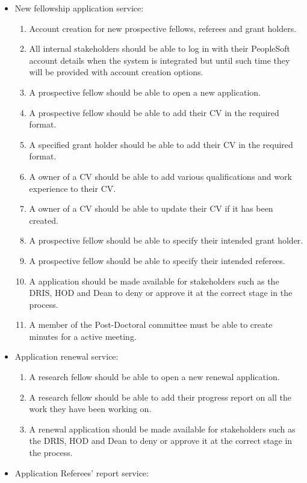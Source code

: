 \documentclass[12pt]{article}
\begin{document}
		\begin{itemize}
			\item New fellowship application service:		
			\begin{enumerate}
				\item Account creation for new prospective fellows, referees and grant holders.
				\item All internal stakeholders should be able to log in with their PeopleSoft account details when the system is integrated but until such time they will be provided with account creation options.				
				\item A prospective fellow should be able to open a new application.
				\item A prospective fellow should be able to add their CV in the required format.
				\item A specified grant holder should be able to add their CV in the required format.
				\item A owner of a CV should be able to add various qualifications and work experience to their CV.
				\item A owner of a CV should be able to update their CV if it has been created. 
				\item A prospective fellow should be able to specify their intended grant holder.	
				\item A prospective fellow should be able to specify their intended referees.				
				\item A application should be made available for stakeholders such as the DRIS, HOD and Dean to deny or approve it at the correct stage in the process.
				\item A member of the Post-Doctoral committee must be able to create minutes for a active meeting. 		
			\end{enumerate}			
			\item Application renewal service:
			\begin{enumerate}					
				\item A research fellow should be able to open a new renewal application. 
				\item A research fellow should be able to add their progress report on all the work they have been working on.	
				\item A renewal application should be made available for stakeholders such as the DRIS, HOD and Dean to deny or approve it at the correct stage in the process.							 					
			\end{enumerate}
			\item Application Referees' report service:

\end{itemize}
\end{document}
